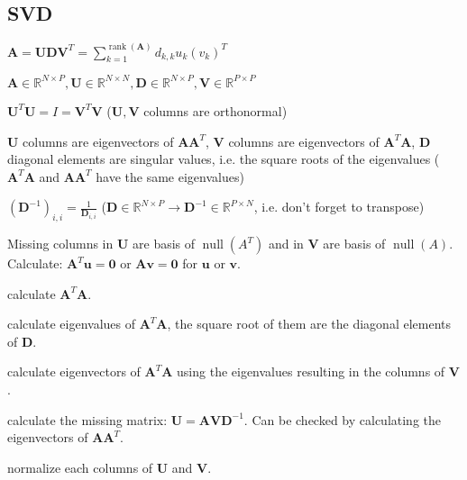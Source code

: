 \documentclass[a4paper, 11pt, landscape]{article}
\begin{document}
\begin{multicols*}{3}
\section{SVD}
\begin{compactitem}
	\item $\mathbf{A} = \mathbf{U} \mathbf{D} \mathbf{V}^T = \sum_{k=1}^{\operatorname{rank}(\mathbf{A})} d_{k,k} u_k (v_k)^T$
	\item $\mathbf{A} \in \mathbb{R}^{N \times P}, \mathbf{U} \in \mathbb{R}^{N \times N}, \mathbf{D} \in \mathbb{R}^{N \times P}, \mathbf{V} \in \mathbb{R}^{P \times P}$
	\item $\mathbf{U}^T \mathbf{U} = I = \mathbf{V}^T \mathbf{V}$ ($\mathbf{U}, \mathbf{V}$ columns are orthonormal)
	\item $\mathbf{U}$ columns are eigenvectors of $\mathbf{A} \mathbf{A}^T$, $\mathbf{V}$ columns are eigenvectors of $\mathbf{A}^T \mathbf{A}$, $\mathbf{D}$ diagonal elements are singular values, i.e. the square roots of the eigenvalues ($\mathbf{A}^T \mathbf{A}$ and $\mathbf{A} \mathbf{A}^T$ have the same eigenvalues)
	\item $(\mathbf{D}^{-1})_{i,i} = \frac{1}{\mathbf{D}_{i, i}}$ ($\mathbf{D} \in \mathbb{R}^{N \times P} \to \mathbf{D}^{-1} \in \mathbb{R}^{P \times N}$, i.e. don't forget to transpose)
	\item Missing columns in $\mathbf{U}$ are basis of $\operatorname{null}(A^T)$ and in $\mathbf{V}$ are basis of $\operatorname{null}(A)$. Calculate: $\mathbf{A}^T \mathbf{u} = \mathbf{0}$ or $\mathbf{A} \mathbf{v} = \mathbf{0}$ for $\mathbf{u}$ or $\mathbf{v}$.
\end{compactitem}

\begin{compactenum}
	\item calculate $\mathbf{A}^T \mathbf{A}$.
	\item calculate eigenvalues of $\mathbf{A}^T \mathbf{A}$, the square root of them are the diagonal elements of $\mathbf{D}$.
	\item calculate eigenvectors of $\mathbf{A}^T \mathbf{A}$ using the eigenvalues resulting in the columns of $\mathbf{V}$.
	\item calculate the missing matrix: $\mathbf{U} = \mathbf{A} \mathbf{V} \mathbf{D}^{-1}$. Can be checked by calculating the eigenvectors of $\mathbf{A} \mathbf{A}^T$.
	\item normalize each columns of $\mathbf{U}$ and $\mathbf{V}$.
\end{compactenum}


\end{multicols*}
\end{document}
